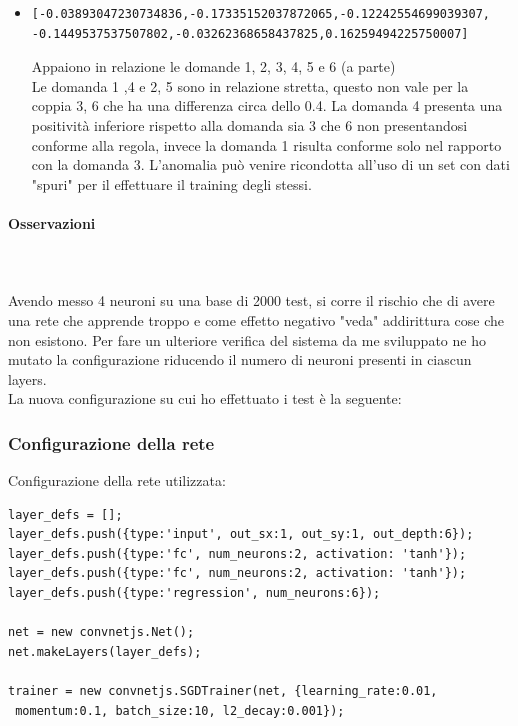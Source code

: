 \documentclass[11pt,a4paper,italian]{article}
\begin{document}
\begin{itemize}
\item  \begin{verbatim}[-0.03893047230734836,-0.17335152037872065,-0.12242554699039307,
-0.1449537537507802,-0.03262368658437825,0.16259494225750007]\end{verbatim}
Appaiono in relazione le domande 1, 2, 3, 4, 5  e 6 (a parte)\\
Le domanda 1 ,4 e 2, 5  sono in relazione stretta, questo non vale per la coppia 3, 6 che ha una differenza circa dello 0.4. La domanda 4 presenta una positivit\`a inferiore rispetto alla domanda sia 3 che 6 non presentandosi conforme alla regola, invece la domanda 1 risulta conforme solo nel rapporto con la domanda 3. L'anomalia pu\`o venire ricondotta all'uso di un set con dati "spuri" per il effettuare il training degli stessi.
\end{itemize}

\paragraph{Osservazioni}\mbox{}
\label{Osservazioni su rete a 4 neuroni}
\\\\
\noindent
Avendo messo 4 neuroni su una base di 2000 test, si corre il rischio che di avere una rete che apprende troppo e come effetto negativo "veda" addirittura cose che non esistono.
Per fare un ulteriore verifica del sistema da me sviluppato ne ho mutato la configurazione riducendo il numero di neuroni presenti in ciascun layers.\\
La nuova configurazione su cui ho effettuato i test \`e la seguente:

\subsubsection{Configurazione della rete}
\label{Configurazione della rete 2 neuroni per 2 layers}
Configurazione della rete utilizzata:\\
\begin{verbatim}layer_defs = [];
layer_defs.push({type:'input', out_sx:1, out_sy:1, out_depth:6});
layer_defs.push({type:'fc', num_neurons:2, activation: 'tanh'});
layer_defs.push({type:'fc', num_neurons:2, activation: 'tanh'});
layer_defs.push({type:'regression', num_neurons:6});

net = new convnetjs.Net();
net.makeLayers(layer_defs);

trainer = new convnetjs.SGDTrainer(net, {learning_rate:0.01,
 momentum:0.1, batch_size:10, l2_decay:0.001});
\end{verbatim}
\end{document}
